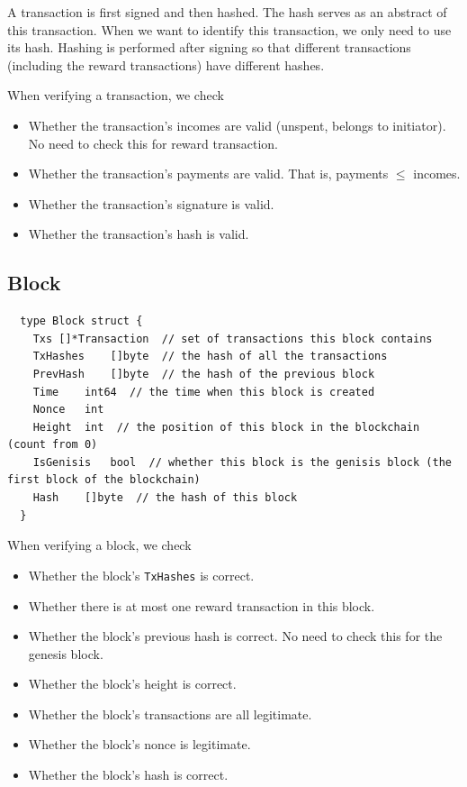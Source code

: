 \documentclass[10pt]{homework}
\begin{document}
A transaction is first signed and then hashed. The hash serves as an abstract of this transaction. When we want to identify this transaction, we only need to use its hash. Hashing is performed after signing so that different transactions (including the reward transactions) have different hashes.

When verifying a transaction, we check
\begin{itemize}
  \item Whether the transaction's incomes are valid (unspent, belongs to initiator). No need to check this for reward transaction.
  \item Whether the transaction's payments are valid. That is, payments $\leq$ incomes.
  \item Whether the transaction's signature is valid.
  \item Whether the transaction's hash is valid.
\end{itemize}

\subsection*{Block}

\begin{lstlisting}
  type Block struct {
    Txs	[]*Transaction  // set of transactions this block contains
    TxHashes	[]byte  // the hash of all the transactions
    PrevHash 	[]byte  // the hash of the previous block
    Time 	int64  // the time when this block is created
    Nonce 	int
    Height 	int  // the position of this block in the blockchain (count from 0)
    IsGenisis	bool  // whether this block is the genisis block (the first block of the blockchain)
    Hash 	[]byte  // the hash of this block
  }
\end{lstlisting}

When verifying a block, we check
\begin{itemize}
  \item Whether the block's \texttt{TxHashes} is correct.
  \item Whether there is at most one reward transaction in this block.
  \item Whether the block's previous hash is correct. No need to check this for the genesis block. 
  \item Whether the block's height is correct.
  \item Whether the block's transactions are all legitimate.
  \item Whether the block's nonce is legitimate.
  \item Whether the block's hash is correct.
\end{itemize}
\end{document}
